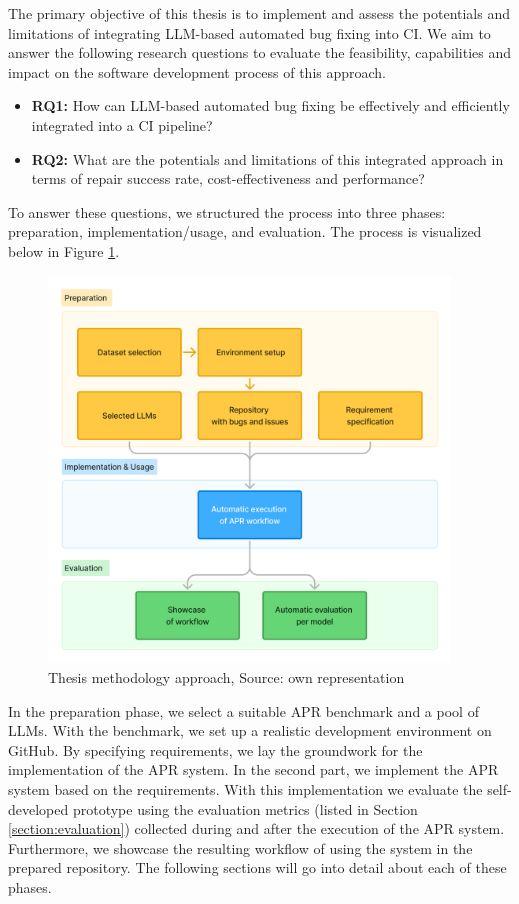 The primary objective of this thesis is to implement and assess the potentials and limitations of integrating LLM-based automated bug fixing into \ac{CI}. We aim to answer the following research questions to evaluate the feasibility, capabilities and impact on the software development process of this approach.

\begin{itemize}
    \item \textbf{RQ1:} How can LLM-based automated bug fixing be effectively and efficiently integrated into a CI pipeline?
    \item \textbf{RQ2:} What are the potentials and limitations of this integrated approach in terms of repair success rate, cost-effectiveness and performance?
\end{itemize}

To answer these questions, we structured the process into three phases: preparation, implementation/usage, and evaluation. The process is visualized below in Figure \ref{fig:method-overview}.

\begin{figure}[H]
    \centering
    \includegraphics[width=0.95\textwidth]{images/flowcharts/method.png}
    \caption{Thesis methodology approach, Source: own representation}
    \label{fig:method-overview}
\end{figure}

In the preparation phase, we select a suitable \ac{APR} benchmark and a pool of \acp{LLM}. With the benchmark, we set up a realistic development environment on GitHub. By specifying requirements, we lay the groundwork for the implementation of the APR system.
In the second part, we implement the \ac{APR} system based on the requirements.
With this implementation we evaluate the self-developed prototype using the evaluation metrics (listed in Section \ref{section:evaluation}) collected during and after the execution of the APR system. Furthermore, we showcase the resulting workflow of using the system in the prepared repository.
The following sections will go into detail about each of these phases.

